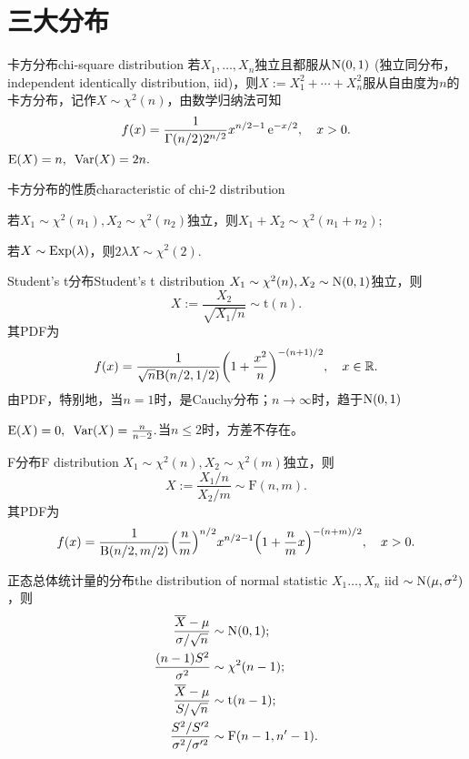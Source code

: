 \section{三大分布}\label{subsec:chi2, t, F}
\begin{definition}{卡方分布}{chi-square distribution}
	若$X_1,\ldots,X_n$独立且都服从$\operatorname{N}(0,1)$ (独立同分布，independent identically distribution, iid)，则$X:=X_1^2+\cdots+X_n^2$服从自由度为$n$的卡方分布，记作$X\sim\chi^2(n)$，由数学归纳法可知
	\begin{align}
		f(x)=\frac1{\Gamma(n/2)2^{n/2}}x^{n/2-1}\mathop{}\!\mathrm{e}^{-x/2},\quad x>0.
	\end{align}
	$\operatorname{E}(X)=n,\enspace\operatorname{Var}(X)=2n.$
\end{definition}
\begin{theorem}{卡方分布的性质}{characteristic of chi-2 distribution}
	\begin{compactenum}
		\item 若$X_1\sim\chi^2(n_1),X_2\sim\chi^2(n_2)$独立，则$X_1+X_2\sim\chi^2(n_1+n_2);$
		\item 若$X\sim\operatorname{Exp}(\lambda)$，则$2\lambda X\sim\chi^2(2).$
	\end{compactenum}
\end{theorem}
\begin{definition}{Student's t分布}{Student's t distribution}
	$X_1\sim\chi^2(n),X_2\sim\operatorname{N}(0,1)$独立，则
	\[
		X:=\frac{X_2}{\sqrt{X_1/n}}\sim\mathrm t(n).
	\]
	其PDF为
	\begin{align}
		f(x)=\frac1{\sqrt n\mathrm B(n/2,1/2)}\biggl(1+\frac{x^2}n\biggr)^{-(n+1)/2},\quad x\in\mathbb R.
	\end{align}
	由PDF，特别地，当$n=1$时，是Cauchy分布；$n\to\infty$时，趋于$\operatorname{N}(0,1)$
	
	$\operatorname{E}(X)=0,\enspace\operatorname{Var}(X)=\frac{n}{n-2}.$当$n\leqslant 2$时，方差不存在。
\end{definition}
\begin{definition}{F分布}{F distribution}
	$X_1\sim\chi^2(n),X_2\sim\chi^2(m)$独立，则 
	\[
		X:=\frac{X_1/n}{X_2/m}\sim\mathrm F(n,m).
	\]
	其PDF为
	\begin{align}
		f(x)=\frac1{\mathrm B(n/2,m/2)}\Bigl(\frac nm\Bigr)^{n/2}x^{n/2-1}\Bigl(1+\frac nmx\Bigr)^{-(n+m)/2},\quad x>0.
	\end{align}
\end{definition}
\begin{theorem}{正态总体统计量的分布}{the distribution of normal statistic}
	$X_1\ldots,X_n$ iid $\sim\operatorname{N}(\mu,\sigma^2)$，则
	\begin{align}
		\label{sample-N}
		\frac{\overline{X}-\mu}{\sigma/\sqrt n}&\sim\operatorname{N}(0,1);\\
		\label{sample-chi2}
		\frac{(n-1)S^2}{\sigma^2}&\sim\chi^2(n-1);\\
		\label{sample-t}
		\frac{\overline{X}-\mu}{S/\sqrt n}&\sim\mathrm t(n-1);\\
		\label{2sample-F}
		\frac{S^2/S'^2}{\sigma^2/\sigma'^2}&\sim\mathrm F(n-1,n'-1).
	\end{align}
\end{theorem}
